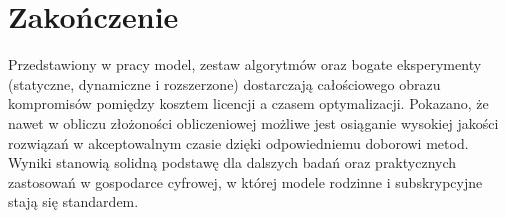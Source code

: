 \section{Zakończenie}

Przedstawiony w pracy model, zestaw algorytmów oraz bogate eksperymenty (statyczne, dynamiczne i rozszerzone) dostarczają całościowego obrazu kompromisów pomiędzy kosztem licencji a czasem optymalizacji. Pokazano, że nawet w obliczu złożoności obliczeniowej możliwe jest osiąganie wysokiej jakości rozwiązań w akceptowalnym czasie dzięki odpowiedniemu doborowi metod. Wyniki stanowią solidną podstawę dla dalszych badań oraz praktycznych zastosowań w gospodarce cyfrowej, w której modele rodzinne i subskrypcyjne stają się standardem.
